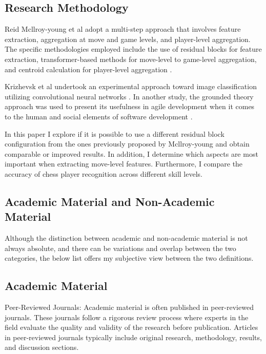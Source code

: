 

\begin{spacing}{2.0}


\section{Research Methodology}

Reid Mcllroy-young et al adopt a multi-step approach that involves feature extraction, aggregation at move and game levels, and player-level aggregation. The specific methodologies employed include the use of residual blocks for feature extraction, transformer-based methods for move-level to game-level aggregation, and centroid calculation for player-level aggregation \cite{stylometryChess}. 

Krizhevsk et al undertook an experimental approach toward image classification utilizing convolutional neural networks \cite{ImageClass}. In another study, the grounded theory approach was used to present its usefulness in agile development when it comes to the human and social elements of software development \cite{agileGrounded}.

In this paper I explore if it is possible to use a different residual block configuration from the ones previously proposed by Mcllroy-young \cite{SuperAI} and obtain comparable or improved results. In addition, I determine which aspects are most important when extracting move-level features. Furthermore, I compare the accuracy of chess player recognition across different skill levels.

\subsection{Academic Material and Non-Academic Material}

Although the distinction between academic and non-academic material is not always absolute, and there can be variations and overlap between the two categories, the below list offers my subjective view between the two definitions. 

\subsection{Academic Material}

Peer-Reviewed Journals: Academic material is often published in peer-reviewed journals. These journals follow a rigorous review process where experts in the field evaluate the quality and validity of the research before publication. Articles in peer-reviewed journals typically include original research, methodology, results, and discussion sections.


\end{spacing}
